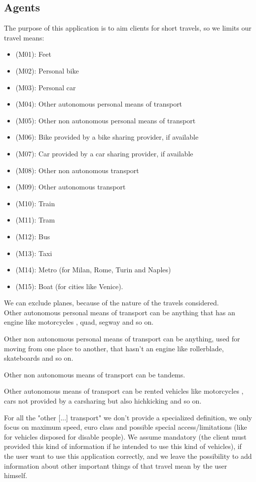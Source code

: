 \documentclass[a4paper,leqno]{book}
\begin{document}
\subsection{Agents}

The purpose of this application is to aim clients for short travels, so we limits our travel means:

\begin{itemize}

\item (M01): Feet 
\item (M02): Personal bike 
\item (M03): Personal car
\item (M04): Other autonomous personal means of transport
\item (M05): Other non autonomous personal means of transport
\item (M06): Bike provided by a bike sharing provider, if available
\item (M07): Car provided by a car sharing provider, if available
\item (M08): Other non autonomous transport
\item (M09): Other autonomous transport
\item (M10): Train
\item (M11): Tram
\item (M12): Bus 
\item (M13): Taxi
\item (M14): Metro (for Milan, Rome, Turin and Naples)
\item (M15): Boat (for cities like Venice).

\end{itemize}

We can exclude planes, because of the nature of the travels considered.\\

Other autonomous personal means of transport can be anything that has an engine like motorcycles , quad, segway and so on.

Other non autonomous personal means of transport can be anything, used for moving from one place to another, that hasn't an engine like rollerblade, skateboards and so on.

Other non autonomous means of transport can be tandems. 

Other autonomous means of transport can be rented vehicles like motorcycles , cars not provided by a carsharing but also hichkicking and so on.

For all the "other [...] transport" we don't provide a specialized definition, we only focus on maximum speed, euro class and possible special access/limitations (like for vehicles disposed for disable people). We assume mandatory (the client must provided this kind of information if he intended to use this kind of vehicles), if the user want to use this application correctly, and we leave the possibility to add information about other important things of that travel mean by the user himself.
\end{document}
